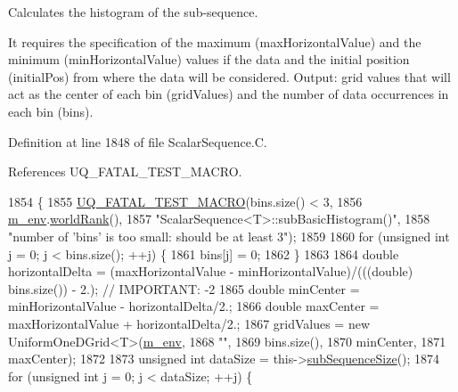 Calculates the histogram of the sub-\/sequence. 

It requires the specification of the maximum ({\ttfamily max\-Horizontal\-Value}) and the minimum ({\ttfamily min\-Horizontal\-Value}) values if the data and the initial position ({\ttfamily initial\-Pos}) from where the data will be considered. Output\-: grid values that will act as the center of each bin ({\ttfamily grid\-Values}) and the number of data occurrences in each bin ({\ttfamily bins}). 

Definition at line 1848 of file Scalar\-Sequence.\-C.



References U\-Q\-\_\-\-F\-A\-T\-A\-L\-\_\-\-T\-E\-S\-T\-\_\-\-M\-A\-C\-R\-O.


\begin{DoxyCode}
1854 \{
1855   \hyperlink{_defines_8h_a56d63d18d0a6d45757de47fcc06f574d}{UQ\_FATAL\_TEST\_MACRO}(bins.size() < 3,
1856                       \hyperlink{class_q_u_e_s_o_1_1_scalar_sequence_a71618cd6351b29361b437af68447a4c8}{m\_env}.\hyperlink{class_q_u_e_s_o_1_1_base_environment_a78b57112bbd0e6dd0e8afec00b40ffa7}{worldRank}(),
1857                       \textcolor{stringliteral}{"ScalarSequence<T>::subBasicHistogram()"},
1858                       \textcolor{stringliteral}{"number of 'bins' is too small: should be at least 3"});
1859 
1860   \textcolor{keywordflow}{for} (\textcolor{keywordtype}{unsigned} \textcolor{keywordtype}{int} j = 0; j < bins.size(); ++j) \{
1861     bins[j] = 0;
1862   \}
1863 
1864   \textcolor{keywordtype}{double} horizontalDelta = (maxHorizontalValue - minHorizontalValue)/(((\textcolor{keywordtype}{double}) bins.size()) - 2.); \textcolor{comment}{//
       IMPORTANT: -2}
1865   \textcolor{keywordtype}{double} minCenter = minHorizontalValue - horizontalDelta/2.;
1866   \textcolor{keywordtype}{double} maxCenter = maxHorizontalValue + horizontalDelta/2.;
1867   gridValues = \textcolor{keyword}{new} UniformOneDGrid<T>(\hyperlink{class_q_u_e_s_o_1_1_scalar_sequence_a71618cd6351b29361b437af68447a4c8}{m\_env},
1868                                              \textcolor{stringliteral}{""},
1869                                              bins.size(),
1870                                        minCenter,
1871                                        maxCenter);
1872 
1873   \textcolor{keywordtype}{unsigned} \textcolor{keywordtype}{int} dataSize = this->\hyperlink{class_q_u_e_s_o_1_1_scalar_sequence_a0288ea295eedc216a1617b3286f6f3a0}{subSequenceSize}();
1874   \textcolor{keywordflow}{for} (\textcolor{keywordtype}{unsigned} \textcolor{keywordtype}{int} j = 0; j < dataSize; ++j) \{

\end{DoxyCode}
